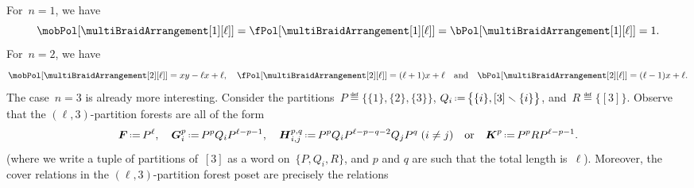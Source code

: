 \begin{example}
For~$n = 1$, we have
\[
\mobPol[{\multiBraidArrangement[1][\ell]}] = \fPol[{\multiBraidArrangement[1][\ell]}] = \bPol[{\multiBraidArrangement[1][\ell]}] = 1.
\]
For~$n = 2$, we have
\[
\mobPol[{\multiBraidArrangement[2][\ell]}] = xy-\ell x+\ell,
\quad
\fPol[{\multiBraidArrangement[2][\ell]}] = (\ell+1)x+\ell
\quad\text{and}\quad
\bPol[{\multiBraidArrangement[2][\ell]}] = (\ell-1)x+\ell.
\]
The case~$n = 3$ is already more interesting.
Consider the partitions~$P \eqdef \big\{ \{1\}, \{2\}, \{3\} \big\}$, $Q_i \eqdef \big\{ \{i\}, [3] \ssm \{i\} \big\}$, and~$R \eqdef \big\{ [3] \big\}$.
Observe that the $(\ell,3)$-partition forests are all of the form
\begin{gather*}
\b{F} \eqdef P^\ell,
\quad
\b{G}_i^p \eqdef P^p Q_i P^{\ell-p-1}, %
\quad
\b{H}_{i,j}^{p,q} \eqdef P^p Q_i P^{\ell-p-q-2} Q_j P^q \;\text{($i \ne j$)} %
\quad\text{or}\quad
\b{K}^p \eqdef P^p R P^{\ell-p-1}. %
\end{gather*}
(where we write a tuple of partitions of~$[3]$ as a word on~$\{P, Q_i, R\}$, and $p$ and $q$ are such that the total length is~$\ell$).
Moreover, the cover relations in the $(\ell,3)$-partition forest poset are precisely the relations

\end{example}
